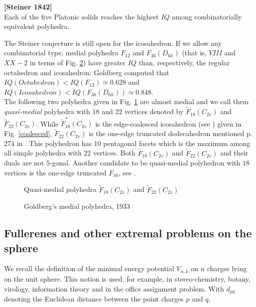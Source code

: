 \begin{conjecture} {\bf [Steiner 1842]}\\
Each of the five Platonic solids reaches the highest $IQ$ among combinatorially 
equivalent polyhedra.
\end{conjecture}
The Steiner conjecture is still open for the icosahedron. If we allow any combinatorial type,
medial polyhedra  $F_{12}$ and $F_{36}(D_{6h})$ (that is, $VIII$ and $XX\!-\!2$ in terms of
Fig. \ref{goldi}) have greater $IQ$ than, respectively, the regular octahedron and icosahedron:
{\sc Goldberg} computed that $IQ(Octahedron) < IQ(F_{12})\simeq 0.628$ and
$IQ(Icosahedron) < IQ(F_{36}(D_{6h}))\simeq 0.848$.\\

The following two polyhedra given in Fig. \ref{twomissings} are almost medial and we call
them {\it quasi-medial} polyhedra with $18$ and $22$ vertices denoted by
$\tilde{F}_{18}(C_{2v})$ and $\tilde{F}_{22}(C_{2v})$. While $\tilde{F}^*_{18}(C_{2v})$ is 
the edge-coalesced icosahedron (see \cite{king}) given in Fig. \ref{coalesced},
$\tilde{F}_{22}(C_{2v})$ is the one-edge truncated dodecahedron mentioned p. 274
in \cite{msbook}. This polyhedron has 10 pentagonal facets which is the maximum among all simple
polyhedra with 22 vertices. Both $\tilde{F}_{18}(C_{2v})$ and 
$\tilde{F}_{22}(C_{2v})$ and their duals are not $5$-gonal.
Another candidate to be quasi-medial polyhedron with $18$ vertices is
the one-edge truncated $F_{16}$, see \cite{msbook}.


\begin{figure}[htb]
\begin{center}
\caption{Quasi-medial polyhedra $\tilde{F}_{18}(C_{2v})$ and
$\tilde{F}_{22}(C_{2v})$}\label{twomissings}
\end{center}
\end{figure}

\begin{figure}[phtb]
\begin{center}
\caption{{\sc Goldberg}'s medial polyhedra, 1933}\label{goldi}
\end{center}
\end{figure}

\newpage
\subsection{Fullerenes and other extremal problems on the sphere}
We recall the definition of the minimal energy potential $V_{n,k}$
on $n$ charges lying on the unit sphere. This notion is used, for example,
in stereo-chemistry, botany, virology, information theory and in the office
assignment problem. With $d_{pq}$ denoting the Euclidean distance between
the point charges $p$ and $q$,

